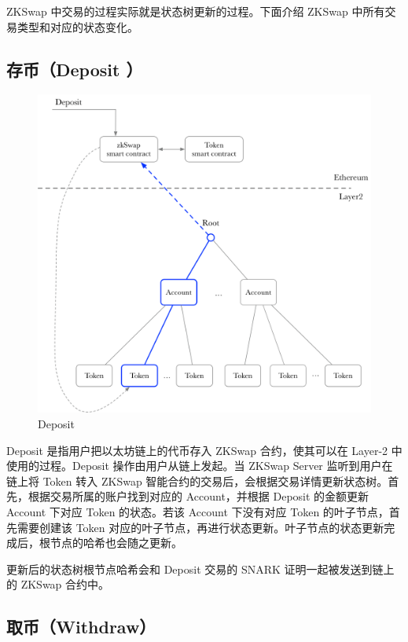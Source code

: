 \documentclass[]{template/llncs}
\begin{document}
ZKSwap 中交易的过程实际就是状态树更新的过程。下面介绍 ZKSwap 中所有交易类型和对应的状态变化。

\subsection{存币（Deposit ）}

\begin{figure}[htbp]
\centering
\includegraphics[width=0.9\columnwidth]{figure/deposit}
\caption{Deposit}
\label{fig:deposit}
\end{figure}

Deposit 是指用户把以太坊链上的代币存入 ZKSwap 合约，使其可以在 Layer-2 中使用的过程。Deposit 操作由用户从链上发起。当 ZKSwap Server 监听到用户在链上将 Token 转入 ZKSwap 智能合约的交易后，会根据交易详情更新状态树。首先，根据交易所属的账户找到对应的 Account，并根据 Deposit 的金额更新 Account 下对应 Token 的状态。若该 Account 下没有对应 Token 的叶子节点，首先需要创建该 Token 对应的叶子节点，再进行状态更新。叶子节点的状态更新完成后，根节点的哈希也会随之更新。

更新后的状态树根节点哈希会和 Deposit 交易的 SNARK 证明一起被发送到链上的 ZKSwap 合约中。

\subsection{取币（Withdraw）}
\end{document}
